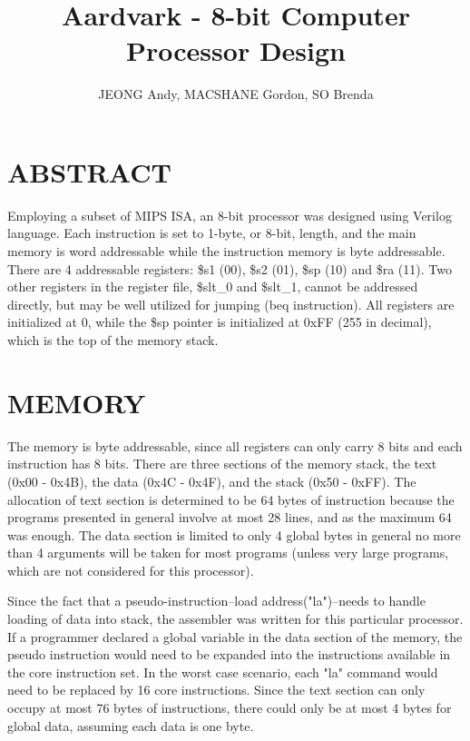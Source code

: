 \documentclass[11pt, titlepage]{article}
\author{JEONG Andy, MACSHANE Gordon, SO Brenda}
\title{Aardvark - 8-bit Computer Processor Design}
\date{\parbox{\linewidth}{}}
\begin{document}
\maketitle
\tableofcontents
\newpage
\setcounter{tocdepth}{1}
\section{ABSTRACT}
Employing a subset of MIPS ISA, an 8-bit processor was designed  using Verilog language. Each instruction is set to 1-byte, or 8-bit, length, and the main memory is word addressable while the instruction memory is byte addressable. There are 4 addressable registers: \$s1 (00), \$s2 (01), \$sp (10) and \$ra (11). Two other registers in the register file, \$slt\_0 and \$slt\_1, cannot be addressed directly, but may be well utilized for jumping (beq instruction). All registers are initialized at 0, while the \$sp pointer is initialized at 0xFF (255 in decimal), which is the top of the memory stack. 
\newpage

\section{MEMORY}
The memory is byte addressable, since all registers can only carry 8 bits and each instruction has 8 bits. There are three sections of the memory stack, the text (0x00 - 0x4B), the data (0x4C - 0x4F), and the stack (0x50 - 0xFF). The allocation of text section is determined to be 64 bytes of instruction because the programs presented in general involve at most 28 lines, and as the maximum 64 was enough. The data section is limited to only 4 global bytes in general no more than 4 arguments will be taken for most programs (unless very large programs, which are not considered for this processor). 

\par Since the fact that a pseudo-instruction--load address("la")--needs to handle loading of data into stack, the assembler was written for this particular processor. If a programmer declared a global variable in the data section of the memory, the pseudo instruction would need to be expanded into the instructions available in the core instruction set. In the worst case scenario, each "la" command would need to be replaced by 16 core instructions. Since the text section can only occupy at most 76 bytes of instructions, there could only be at most 4 bytes for global data, assuming each data is one byte. 

\newpage
\end{document}
